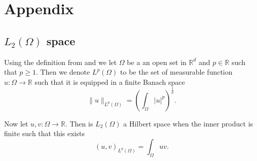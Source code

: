 \newpage
\section{Appendix}%
\label{sec:appendix}

\subsection{$L_{2} \left( \Omega  \right)$ space }%
\label{sub:_l__2_space_}

Using the definition from \cite{manzoni2021optimal} and we let $\Omega $ be a an open set in $\mathbb{R} ^{d}$ and $p \in \mathbb{R} $  such that $p \ge 1$. Then we denote
$L^{p}\left( \Omega  \right) $ to be the set of measurable function $u: \Omega \to \mathbb{R} $ such that  it is equipped
in a finite Banach space \[
\|u\|_{L^{p}\left( \Omega  \right)}^{} = \left( \int_{\Omega }^{} \left\lvert u \right\rvert ^{p}
\right)^{\frac{1}{p}}.
\]

Now let $u,v: \Omega  \to \mathbb{R} $. Then is $L_{2}\left( \Omega  \right)$ a Hilbert space when the inner product is
finite such that this exists \[
\left( u,v \right)_{L^{p}\left( \Omega   \right)} = \int_{\Omega }^{} uv  .
\]








